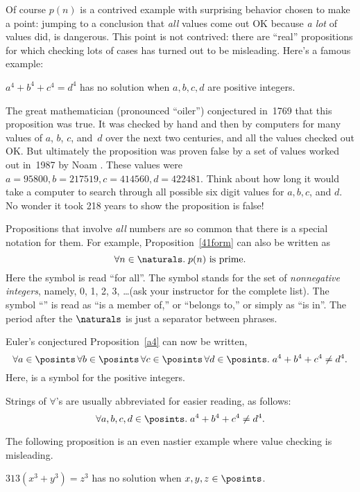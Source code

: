 Of course $p(n)$ is a contrived example with surprising behavior
chosen to make a point: jumping to a conclusion that \emph{all} values
come out OK because \emph{a lot} of values did, is dangerous.  This
point is not contrived: there are ``real'' propositions for which
checking lots of cases has turned out to be misleading.  Here's a
famous example:
\begin{proposition}\label{a4}
$a^4 + b^4 + c^4 = d^4$ has no solution when $a, b, c, d$ are positive
integers.
\end{proposition}
The great mathematician  (pronounced ``oiler'') conjectured
in~1769 that this proposition was true.  It was checked by hand and
then by computers for many values of $a$, $b$, $c$, and~$d$ over the
next two centuries, and all the values checked out OK.  But ultimately
the proposition was proven false by a set of values worked out in~1987
by Noam .  These values were $a = 95800, b = 217519, c =
414560, d = 422481$.  Think about how long it would take a computer to
search through all possible six digit values for $a,b,c$, and $d$.
No wonder it took 218 years to show the proposition is false!

Propositions that involve \emph{all} numbers are so common that there
is a special notation for them.  For example, Proposition~\ref{41form}
can also be written as
\begin{equation}\label{pn}
\forall n \in \naturals.\; p(n) \text{ is prime}.
\end{equation}
Here the symbol \term{$\forall$} is read ``for all''.  The symbol
\term{$\naturals$} stands for the set of \emph{nonnegative integers},
namely, 0, 1, 2, 3, \dots (ask your instructor for the complete list).
The symbol ``\term{$\in$}'' is read as ``is a member of,'' or
``belongs to,'' or simply as ``is in''.  The period after the
$\naturals$ is just a separator between phrases.

Euler's conjectured Proposition~\ref{a4} can now be written,
\[
\forall a \in \posints\, \forall b \in \posints\, \forall c \in
\posints\, \forall d \in \posints.\; a^4 + b^4 + c^4 \neq d^4.
\]
Here, \term{$\posints$} is a symbol for the positive integers.

Strings of $\forall$'s are usually abbreviated for easier reading, as
follows:
\[
\forall a, b, c, d \in \posints.\; a^4 + b^4 + c^4 \neq d^4.
\]

The following proposition is an even nastier example where value
checking is misleading.
\begin{proposition}\label{313elliptic}
$313 (x^3 + y^3) = z^3$ has no solution when $x, y, z\in\posints$.
\end{proposition}

